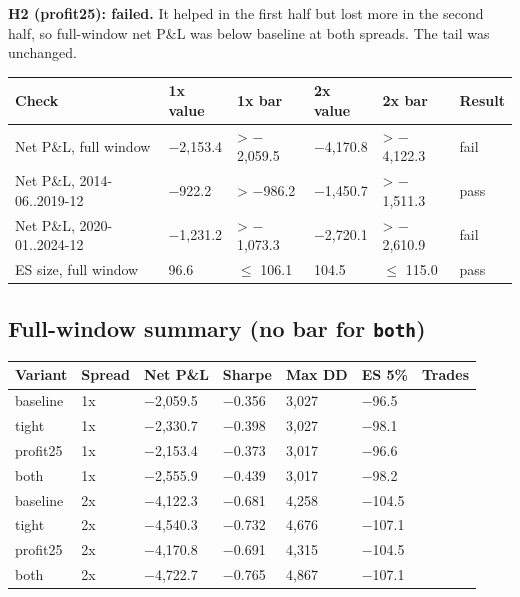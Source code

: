 \documentclass{article}
\begin{document}
\textbf{H2 (profit25): failed.} It helped in the first half but lost more in the second half, so full-window net P\&L was below baseline at both spreads. The tail was unchanged.

\begin{center}\small
\begin{tabularx}{\linewidth}{>{\raggedright\arraybackslash}X l l l l l}
\toprule
\textbf{Check} & \textbf{1x value} & \textbf{1x bar} & \textbf{2x value} & \textbf{2x bar} & \textbf{Result} \\
\midrule
Net P\&L, full window & \ensuremath{-}2,153.4 & > \ensuremath{-}2,059.5 & \ensuremath{-}4,170.8 & > \ensuremath{-}4,122.3 & fail \\
Net P\&L, 2014-06..2019-12 & \ensuremath{-}922.2 & > \ensuremath{-}986.2 & \ensuremath{-}1,450.7 & > \ensuremath{-}1,511.3 & pass \\
Net P\&L, 2020-01..2024-12 & \ensuremath{-}1,231.2 & > \ensuremath{-}1,073.3 & \ensuremath{-}2,720.1 & > \ensuremath{-}2,610.9 & fail \\
ES size, full window & 96.6 & \ensuremath{\leq} 106.1 & 104.5 & \ensuremath{\leq} 115.0 & pass \\
\bottomrule
\end{tabularx}
\end{center}

\subsection{Full-window summary (no bar for \texttt{both})}

\begin{center}\small
\begin{tabularx}{\linewidth}{l l l l l l >{\raggedright\arraybackslash}X}
\toprule
\textbf{Variant} & \textbf{Spread} & \textbf{Net P\&L} & \textbf{Sharpe} & \textbf{Max DD} & \textbf{ES 5\%} & \textbf{Trades} \\
\midrule
baseline & 1x & \ensuremath{-}2,059.5 & \ensuremath{-}0.356 & 3,027 & \ensuremath{-}96.5 & 131 \\
tight & 1x & \ensuremath{-}2,330.7 & \ensuremath{-}0.398 & 3,027 & \ensuremath{-}98.1 & 133 \\
profit25 & 1x & \ensuremath{-}2,153.4 & \ensuremath{-}0.373 & 3,017 & \ensuremath{-}96.6 & 132 \\
both & 1x & \ensuremath{-}2,555.9 & \ensuremath{-}0.439 & 3,017 & \ensuremath{-}98.2 & 134 \\
baseline & 2x & \ensuremath{-}4,122.3 & \ensuremath{-}0.681 & 4,258 & \ensuremath{-}104.5 & 131 \\
tight & 2x & \ensuremath{-}4,540.3 & \ensuremath{-}0.732 & 4,676 & \ensuremath{-}107.1 & 133 \\
profit25 & 2x & \ensuremath{-}4,170.8 & \ensuremath{-}0.691 & 4,315 & \ensuremath{-}104.5 & 132 \\
both & 2x & \ensuremath{-}4,722.7 & \ensuremath{-}0.765 & 4,867 & \ensuremath{-}107.1 & 134 \\
\bottomrule
\end{tabularx}
\end{center}
\end{document}

